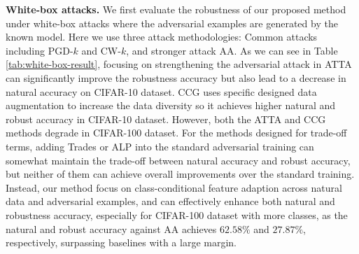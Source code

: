 \documentclass[10pt,twocolumn,letterpaper]{article}
\begin{document}
	
\noindent\textbf{White-box attacks.} We first evaluate the robustness of our proposed method under white-box attacks where the adversarial examples are generated by the known model. Here we use three attack methodologies: Common attacks including PGD-$k$ and CW-$k$, and stronger attack AA.
As we can see in Table\,\ref{tab:white-box-result}, focusing on strengthening the adversarial attack in ATTA can significantly improve the robustness accuracy but also lead to a decrease in natural accuracy on CIFAR-10 dataset. CCG uses specific designed data augmentation to increase the data diversity so it achieves higher natural and robust accuracy in CIFAR-10 dataset. However, both the ATTA and CCG methods degrade in CIFAR-100 dataset. 
For the methods designed for trade-off terms, adding Trades or ALP into the standard adversarial training can somewhat maintain the trade-off between natural accuracy and robust accuracy, but neither of them can achieve overall improvements over the standard training. Instead, our method focus on class-conditional feature adaption across natural data and adversarial examples, and can effectively enhance both natural and robustness accuracy, especially for CIFAR-100 dataset with more classes, as the natural and robust accuracy against AA achieves $62.58\%$ and $27.87\%$, respectively, surpassing baselines with a large margin.




\end{document}
